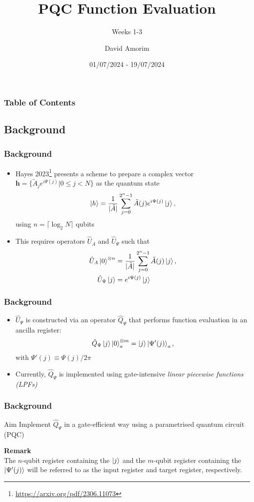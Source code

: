 \documentclass{beamer}
\title[PQC Function Evaluation]{PQC Function Evaluation}
\subtitle{Weeks 1-3}
\author[David Amorim]{David Amorim}
\institute[]{}
\date[22/07/2024]{01/07/2024 - 19/07/2024}
\begin{document}
\frame{\titlepage}

\begin{frame}
\frametitle{Table of Contents}
\tableofcontents
\end{frame}

\begin{frame}
\section{Background}
\frametitle{Background}

\begin{itemize}
\item Hayes 2023\footnote{\url{https://arxiv.org/pdf/2306.11073}} presents a scheme to prepare a complex vector $\boldsymbol{h} =\{ \tilde{A}_j e^{i \Psi (j)} | 0 \leq j < N \}$ as the quantum state 
\begin{equation}
\ket{h} = \frac{1}{|\tilde{A}|} \sum^{2^n-1}_{j=0} \tilde{A}(j) e^{i \Psi (j)} \ket{j}, 
\end{equation}
using $n = \lceil \log_2 N \rceil$ qubits
\item This requires operators $\hat{U}_A$ and $\hat{U}_\Psi$ such that 
\begin{align}
\hat{U}_A \ket{0}^{\otimes n} &=  \frac{1}{|\tilde{A}|} \sum^{2^n-1}_{j=0} \tilde{A}(j) \ket{j}, \\
\hat{U}_\Psi \ket{j} &= e^{i \Psi (j)} \ket{j}
\end{align}
\end{itemize}
\end{frame}

\begin{frame}
\frametitle{Background}
\begin{itemize}
\item $\hat{U}_\Psi$ is constructed via an operator $\hat{Q}_\Psi$ that performs \alert{function evaluation} in an ancilla register:
\begin{equation}
\hat{Q}_\Psi  \ket{j} \ket{0}^{\otimes m}_a = \ket{j} \ket{\Psi'(j)}_a,
\end{equation}
with $\Psi'(j) \equiv \Psi(j) / 2 \pi$
\item Currently, $\hat{Q}_\Psi$ is implemented using gate-intensive \emph{linear piecewise functions (LPFs)}
\end{itemize}
\end{frame}

\begin{frame}
\frametitle{Background}
\begin{alertblock}{Aim}
Implement $\hat{Q}_\Psi$ in a gate-efficient way using a parametrised quantum circuit (PQC)
\end{alertblock}
\vspace{1cm}
\textbf{Remark} \\
The $n$-qubit register containing the $\ket{j}$ and the $m$-qubit register containing the $\ket{\Psi'(j)}$ will be referred to as the \alert{input register} and \alert{target register}, respectively. 
\end{frame}
\end{document}
